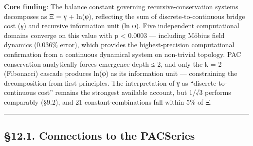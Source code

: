 \documentclass[
  11pt,
  a4paper]{article}
\begin{document}
\textbf{Core finding}: The balance constant governing
recursive-conservation systems decomposes as Ξ = γ + ln(φ), reflecting
the sum of discrete-to-continuous bridge cost (γ) and recursive
information unit (ln φ). Five independent computational domains converge
on this value with p \textless{} 0.0003 --- including Möbius field
dynamics (0.036\% error), which provides the highest-precision
computational confirmation from a continuous dynamical system on
non-trivial topology. PAC conservation analytically forces emergence
depth ≤ 2, and only the k = 2 (Fibonacci) cascade produces ln(φ) as its
information unit --- constraining the decomposition from first
principles. The interpretation of γ as ``discrete-to-continuous cost''
remains the strongest available account, but 1/√3 performs comparably
(§9.2), and 21 constant-combinations fall within 5\% of Ξ.

\begin{center}\rule{0.5\linewidth}{0.5pt}\end{center}

\subsection{§12.1. Connections to the
PACSeries}\label{connections-to-the-pacseries}
\end{document}
